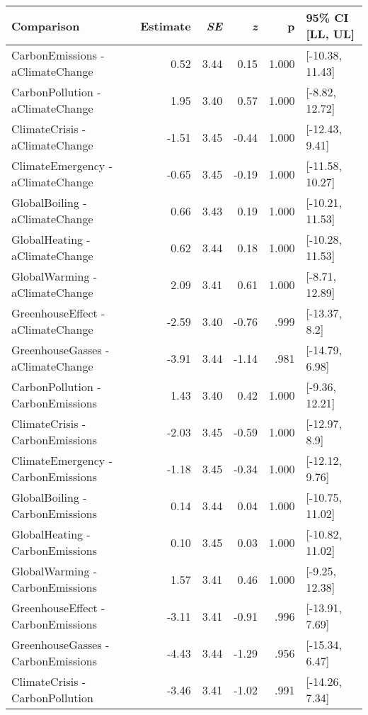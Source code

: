 \begin{table}[ht]
\centering
\begin{tabular}{lrrrrl}
  \hline
Comparison & Estimate & \textit{SE} & \textit{z} & p & 95\% CI [LL, UL] \\ 
  \hline
CarbonEmissions - aClimateChange & 0.52 & 3.44 & 0.15 & 1.000 & [-10.38, 11.43] \\ 
  CarbonPollution - aClimateChange & 1.95 & 3.40 & 0.57 & 1.000 & [-8.82, 12.72] \\ 
  ClimateCrisis - aClimateChange & -1.51 & 3.45 & -0.44 & 1.000 & [-12.43, 9.41] \\ 
  ClimateEmergency - aClimateChange & -0.65 & 3.45 & -0.19 & 1.000 & [-11.58, 10.27] \\ 
  GlobalBoiling - aClimateChange & 0.66 & 3.43 & 0.19 & 1.000 & [-10.21, 11.53] \\ 
  GlobalHeating - aClimateChange & 0.62 & 3.44 & 0.18 & 1.000 & [-10.28, 11.53] \\ 
  GlobalWarming - aClimateChange & 2.09 & 3.41 & 0.61 & 1.000 & [-8.71, 12.89] \\ 
  GreenhouseEffect - aClimateChange & -2.59 & 3.40 & -0.76 & .999 & [-13.37, 8.2] \\ 
  GreenhouseGasses - aClimateChange & -3.91 & 3.44 & -1.14 & .981 & [-14.79, 6.98] \\ 
  CarbonPollution - CarbonEmissions & 1.43 & 3.40 & 0.42 & 1.000 & [-9.36, 12.21] \\ 
  ClimateCrisis - CarbonEmissions & -2.03 & 3.45 & -0.59 & 1.000 & [-12.97, 8.9] \\ 
  ClimateEmergency - CarbonEmissions & -1.18 & 3.45 & -0.34 & 1.000 & [-12.12, 9.76] \\ 
  GlobalBoiling - CarbonEmissions & 0.14 & 3.44 & 0.04 & 1.000 & [-10.75, 11.02] \\ 
  GlobalHeating - CarbonEmissions & 0.10 & 3.45 & 0.03 & 1.000 & [-10.82, 11.02] \\ 
  GlobalWarming - CarbonEmissions & 1.57 & 3.41 & 0.46 & 1.000 & [-9.25, 12.38] \\ 
  GreenhouseEffect - CarbonEmissions & -3.11 & 3.41 & -0.91 & .996 & [-13.91, 7.69] \\ 
  GreenhouseGasses - CarbonEmissions & -4.43 & 3.44 & -1.29 & .956 & [-15.34, 6.47] \\ 
  ClimateCrisis - CarbonPollution & -3.46 & 3.41 & -1.02 & .991 & [-14.26, 7.34] \\ 

\end{tabular}
\end{table}
